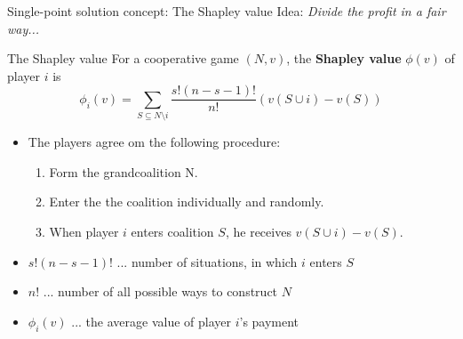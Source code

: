 \documentclass{beamer}
\begin{document}
\begin{frame}{Single-point solution concept: The Shapley value}
    Idea: \textit{Divide the profit in a fair way...}
    \begin{block}{The Shapley value}
        For a cooperative game $(N,v)$, the \textbf{Shapley value} $\phi(v)$ of player $i$ is
        \[
        \phi_i(v) = \sum_{S \subseteq N \setminus i}\frac{s!(n-s-1)!}{n!}\left(v(S \cup i) - v(S)\right)
        \]
    \end{block}
    \begin{itemize}
        \item<2-> The players agree om the following procedure:
        \begin{enumerate}
			\item<3-> Form the grandcoalition N.
			\item<4-> Enter the the coalition individually and randomly.
			\item<5-> When player $i$ enters coalition $S$, he receives $v\left(S \cup i\right)-v\left(S\right)$.
		\end{enumerate}
		\item<6-> $s!\left(n-s-1\right)!$ ... number of situations, in which $i$ enters $S$
		\item<7-> $n!$ ... number of all possible ways to construct $N$
		\item<8-> $\phi_i(v)$ ... the average value of player $i$'s payment
    \end{itemize}
\end{frame}


\end{document}
